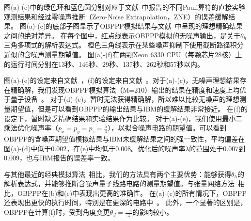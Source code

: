 图(a)-(e)中的绿色环和蓝色圆分别对应于文献~\cite{kim2023evidence}中报告的不同Pauli算符的直接实验观测结果和经过零噪声推断（Zero-Noise Extrapolation，ZNE）的误差缓解结果。
图(a)-(c)的底部子图显示了OBPPP模拟结果与文献~\cite{kim2023evidence}中呈现的理想精确结果之间的绝对差异。
在每个图中，红点线表示OBPPP模拟的无噪声输出，是关于$\theta_h$三角多项式的解析表达式。
橙色三角线表示在某些噪声抑制下使用截断路径积分近似的含噪声测量期望值。
图(a)-(f)在两颗Xeon 6330 CPU（每颗芯片28核）上的运行时间分别在13秒、146秒、29秒、137秒、262秒和57秒以内。

图(a)-(e)的设定来自文献~\cite{kim2023evidence}，(f)的设定来自文献~\cite{anand2023classical}。对于(a)-(c)，无噪声理想结果存在精确解，我们发现OBPPP模拟算法（M=210）输出的结果在精度和速度上均优于量子设备~\cite{beguvsic2023fast, kim2023evidence}。
对于(d)-(e)，暂时无法获得精确解，所以难以比较无噪声的理想测量期望值，但是可以看到OBPPP的输出结果与IBM的缓解结果非常接近。
在(f)的设定下，暂时缺乏精确结果和实验结果作为比较。
对于(a)-(e)，我们使用最小二乘法优化噪声率（$p_x=p_y=p_z=\frac{\lambda}{4}$），以拟合噪声电路的期望值。可以看到OBPPP的含噪声期望值模拟结果与IBM未缓解结果之间的强一致性，平均偏差在图(a)-(d)中低于$0.002$，在(e)中均低于$0.008$。优化后的噪声率$\lambda$的范围处于$0.007$到$0.009$，也与IBM报告的误差率一致。



与其他最近的经典模拟算法~\cite{tindall2023efficient,beguvsic2023fast}相比，我们的方法具有两个主要优势：能够获得$\theta_h$的解析表达式，并能够推断含噪声量子线路电路的测量期望值。与张量网络方法~\cite{tindall2023efficient}相比，OBPPP在(b)和(c)中表现出更高的准确性。
在(a)-(e)的所有情况下，OBPPP还表现出更快的执行时间，特别是在更深的电路中~\cite{tindall2023efficient}。
此外，一个显著的区别是，OBPPP在计算(f)时，受到角度变更$\theta_J=\frac{-\pi}{4}$的影响较小。


